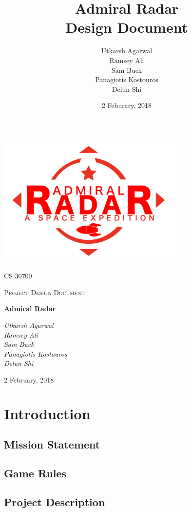 \documentclass[12pt]{article}
\title{ Admiral Radar \\ \large Design Document}
\author{Utkarsh Agarwal\\ Ramsey Ali \\ Sam Buck \\ Panagiotis Kostouros \\ Delun Shi }
\date{2 Feburary, 2018}
\begin{document}
\begin{titlepage}
	\centering
	\includegraphics[width=0.7\textwidth]{logo}\par\vspace{1cm}
	{\scshape\LARGE CS 30700 \par}
	{\scshape\Large Project Design Document\par}
	\vspace{1.5cm}
	{\Huge\bfseries Admiral Radar\par}
	\vspace{2cm}
	{\large\itshape Utkarsh Agarwal\\ Ramsey Ali \\ Sam Buck \\ Panagiotis Kostouros \\ Delun Shi \par}

	\vfill
	{\large 2 February, 2018 \par}
\end{titlepage}

\tableofcontents

\section{Introduction}
\subsection{Mission Statement}


\subsection{Game Rules}


\subsection{Project Description}

\end{document}

